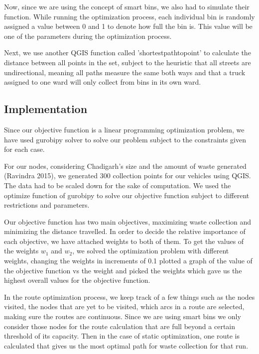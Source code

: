 \documentclass[12pt]{article}
\begin{document}
Now, since we are using the concept of smart bins, we also had to simulate their function. While running the optimization process, each individual bin is randomly assigned a value between 0 and 1 to denote how full the bin is. This value will be one of the parameters during the optimization process.

Next, we use another QGIS function called 'shortestpathtopoint' to calculate the distance between all points in the set, subject to the heuristic that all streets are undirectional, meaning all paths measure the same both ways and that a truck assigned to one ward will only collect from bins in its own ward.

\subsection{Implementation}

Since our objective function is a linear programming optimization problem, we have used gurobipy solver to solve our problem subject to the constraints given for each case.

For our nodes, considering Chadigarh's size and the amount of waste generated (Ravindra 2015), we generated 300 collection points for our vehicles using QGIS. The data had to be scaled down for the sake of computation. We used the optimize function of gurobipy to solve our objective function subject to different restrictions and parameters.

Our objective function has two main objectives, maximizing waste collection and minimizing the distance travelled. In order to decide the relative importance of each objective, we have attached weights to both of them. To get the values of the weights $w_1$ and $w_2$, we solved the optimization problem with different weights, changing the weights in increments of 0.1 plotted a graph of the value of the objective function vs the weight and picked the weights which gave us the highest overall values for the objective function.       

In the route optimization process, we keep track of a few things such as the nodes visited, the nodes that are yet to be visited, which arcs in a route are selected, making sure the routes are continuous. Since we are using smart bins we only consider those nodes for the route calculation that are full beyond a certain threshold of its capacity. Then in the case of static optimization, one route is calculated that gives us the most optimal path for waste collection for that run.
\end{document}

